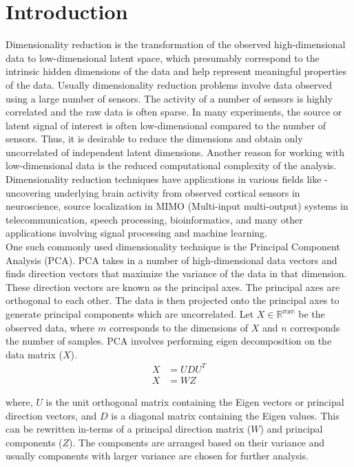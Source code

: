 

\section{Introduction}

Dimensionality reduction is the transformation of the observed high-dimensional data to low-dimensional latent space, which presumably correspond to the intrinsic hidden dimensions of the data and help represent meaningful properties of the data. Usually dimensionality reduction problems involve data observed using a large number of sensors. The activity of a number of sensors is highly correlated and the raw data is often sparse. In many experiments, the source or latent signal of interest is often low-dimensional compared to the number of sensors. Thus, it is desirable to reduce the dimensions and obtain only uncorrelated of independent latent dimensions. Another reason for working with low-dimensional data is the reduced computational complexity of the analysis. Dimensionality reduction techniques have applications in various fields like - uncovering underlying brain activity from observed cortical sensors in neuroscience, source localization in MIMO (Multi-input multi-output) systems in telecommunication, speech processing, bioinformatics, and many other applications involving signal processing and machine learning.   \\

One such commonly used dimensionality technique is the Principal Component Analysis (PCA). PCA takes in a number of high-dimensional data vectors and finds direction vectors that maximize the variance of the data in that dimension. These direction vectors are known as the principal axes. The principal axes are orthogonal to each other. The data is then projected onto the principal axes to generate principal components which are uncorrelated. Let $X \in \mathbb{R^{mxn}}$ be the observed data, where $m$ corresponds to the dimensions of $X$ and $n$ corresponds the number of samples. PCA involves performing eigen decomposition on the data matrix ($X$). 
\begin{align*}
	X &= UDU^T \\
	X &= WZ
\end{align*}

where, $U$ is the unit orthogonal matrix containing the Eigen vectors or principal direction vectors, and $D$ is a diagonal matrix containing the Eigen values. This can be rewritten in-terms of a principal direction matrix ($W$) and principal components ($Z$). The components are arranged based on their variance and usually components with larger variance are chosen for further analysis.  \\


